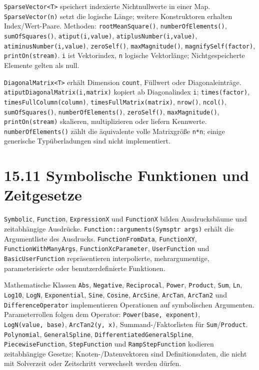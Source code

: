 \documentclass[
  12pt
]{book}
\begin{document}
\texttt{SparseVector\textless{}T\textgreater{}} speichert indexierte
Nichtnullwerte in einer Map. \texttt{SparseVector(n)} setzt die logische
Länge; weitere Konstruktoren erhalten Index/Wert-Paare. Methoden:
\texttt{rootMeanSquare()}, \texttt{numberOfElements()},
\texttt{sumOfSquares()}, \texttt{atiput(i,value)},
\texttt{atiplusNumber(i,value)}, \texttt{atiminusNumber(i,value)},
\texttt{zeroSelf()}, \texttt{maxMagnitude()},
\texttt{magnifySelf(factor)}, \texttt{printOn(stream)}. \texttt{i} ist
Vektorindex, \texttt{n} logische Vektorlänge; Nichtgespeicherte Elemente
gelten als null.

\texttt{DiagonalMatrix\textless{}T\textgreater{}} erhält Dimension
\texttt{count}, Füllwert oder Diagonaleinträge.
\texttt{atiputDiagonalMatrix(i,matrix)} kopiert ab Diagonalindex
\texttt{i}; \texttt{times(factor)}, \texttt{timesFullColumn(column)},
\texttt{timesFullMatrix(matrix)}, \texttt{nrow()}, \texttt{ncol()},
\texttt{sumOfSquares()}, \texttt{numberOfElements()},
\texttt{zeroSelf()}, \texttt{maxMagnitude()}, \texttt{printOn(stream)}
skalieren, multiplizieren oder liefern Kennwerte.
\texttt{numberOfElements()} zählt die äquivalente volle Matrixgröße
\texttt{n*n}; einige generische Typüberladungen sind nicht
implementiert.

\hypertarget{symbolische-funktionen-und-zeitgesetze}{%
\section{\texorpdfstring{{15.11} Symbolische Funktionen und
Zeitgesetze}{15.11 Symbolische Funktionen und Zeitgesetze}}\label{symbolische-funktionen-und-zeitgesetze}}

\texttt{Symbolic}, \texttt{Function}, \texttt{ExpressionX} und
\texttt{FunctionX} bilden Ausdrucksbäume und zeitabhängige Ausdrücke.
\texttt{Function::arguments(Symsptr\ args)} erhält die Argumentliste des
Ausdrucks. \texttt{FunctionFromData}, \texttt{FunctionXY},
\texttt{FunctionWithManyArgs}, \texttt{FunctionXcParameter},
\texttt{UserFunction} und \texttt{BasicUserFunction} repräsentieren
interpolierte, mehrargumentige, parameterisierte oder benutzerdefinierte
Funktionen.

Mathematische Klassen \texttt{Abs}, \texttt{Negative},
\texttt{Reciprocal}, \texttt{Power}, \texttt{Product}, \texttt{Sum},
\texttt{Ln}, \texttt{Log10}, \texttt{LogN}, \texttt{Exponential},
\texttt{Sine}, \texttt{Cosine}, \texttt{ArcSine}, \texttt{ArcTan},
\texttt{ArcTan2} und \texttt{DifferenceOperator} implementieren
Operationen auf symbolischen Argumenten. Parameterrollen folgen dem
Operator: \texttt{Power(base,\ exponent)}, \texttt{LogN(value,\ base)},
\texttt{ArcTan2(y,\ x)}, Summand-/Faktorlisten für
\texttt{Sum}/\texttt{Product}. \texttt{Polynomial},
\texttt{GeneralSpline}, \texttt{DifferentiatedGeneralSpline},
\texttt{PiecewiseFunction}, \texttt{StepFunction} und
\texttt{RampStepFunction} kodieren zeitabhängige Gesetze;
Knoten-/Datenvektoren sind Definitionsdaten, die nicht mit Solverzeit
oder Zeitschritt verwechselt werden dürfen.
\end{document}
